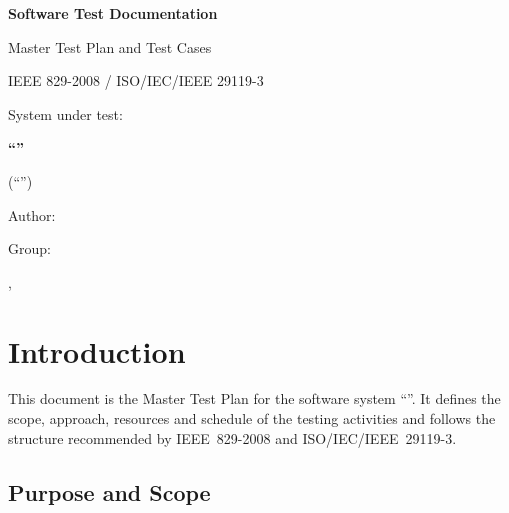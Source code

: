 \documentclass[12pt,a4paper]{extarticle}
\begin{document}
\sloppy

\begin{center}
{\large\bfseries Software Test Documentation\par}
\vspace{0.2cm}
{\normalsize Master Test Plan and Test Cases\par}
\vspace{0.15cm}
{\normalsize IEEE 829-2008 / ISO/IEC/IEEE 29119-3\par}
\vspace{0.9cm}
{\large System under test:\par}
\vspace{0.2cm}
{\Large\bfseries \enquote{\hseProjectNameEn}\par}
\vspace{0.15cm}
{\normalsize (\enquote{\projectname})\par}
\vspace{1.2cm}
{\normalsize Author: \hseAuthorName\par}
\vspace{0.1cm}
{\normalsize Group: \hseGroup\par}
\vspace{0.1cm}
{\normalsize \hseCityEn, \hseYear\par}
\end{center}

\vspace{0.5cm}

\hypersetup{linkcolor=black}
\tableofcontents
\hypersetup{linkcolor=blue}
\clearpage


\section{Introduction}

This document is the Master Test Plan for the software system \enquote{\hseProjectNameEn}. It defines the scope, approach, resources and schedule of the testing activities and follows the structure recommended by IEEE~829-2008 and ISO/IEC/IEEE~29119-3.

\subsection{Purpose and Scope}
\end{document}
